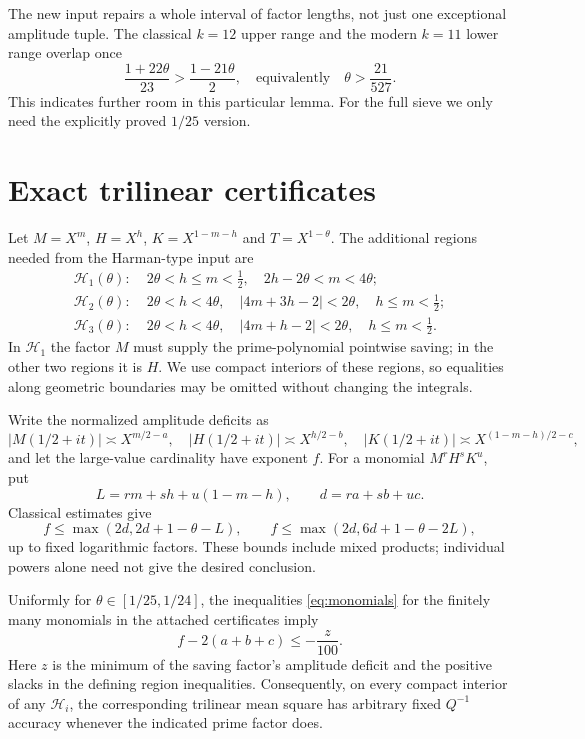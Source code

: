 \begin{remark}
The new input repairs a whole interval of factor lengths, not just
one exceptional amplitude tuple.
The classical $k=12$ upper range and the modern $k=11$ lower range
overlap once
\[
 \frac{1+22\theta}{23}>
       \frac{1-21\theta}{2},
 \quad\text{equivalently}\quad \theta>\frac{21}{527}.
\]
This indicates further room in this particular lemma.
For the full sieve we only need the explicitly proved $1/25$ version.
\end{remark}

\section{Exact trilinear certificates}

Let $M=X^m$, $H=X^h$, $K=X^{1-m-h}$ and
$T=X^{1-\theta}$. The additional regions needed from the
Harman-type input are
\begin{align*}
 \mathcal H_1(\theta):\;&
 2\theta<h\le m<\tfrac12,\quad
 2h-2\theta<m<4\theta;\\
 \mathcal H_2(\theta):\;&
 2\theta<h<4\theta,\quad
 |4m+3h-2|<2\theta,\quad h\le m<\tfrac12;\\
 \mathcal H_3(\theta):\;&
 2\theta<h<4\theta,\quad
 |4m+h-2|<2\theta,\quad h\le m<\tfrac12.
\end{align*}
In $\mathcal H_1$ the factor $M$ must supply the prime-polynomial
pointwise saving; in the other two regions it is $H$.
We use compact interiors of these regions, so equalities along
geometric boundaries may be omitted without changing the integrals.

Write the normalized amplitude deficits as
\[
 |M(1/2+it)|\asymp X^{m/2-a},\quad
 |H(1/2+it)|\asymp X^{h/2-b},\quad
 |K(1/2+it)|\asymp X^{(1-m-h)/2-c},
\]
and let the large-value cardinality have exponent $f$.
For a monomial $M^rH^sK^u$, put
\[
 L=rm+sh+u(1-m-h),\qquad d=ra+sb+uc.
\]
Classical estimates give
\begin{equation}\label{eq:monomials}
 f\le\max(2d,2d+1-\theta-L),\qquad
 f\le\max(2d,6d+1-\theta-2L),
\end{equation}
up to fixed logarithmic factors.
These bounds include mixed products; individual powers alone need
not give the desired conclusion.

\begin{lemma}\label{lem:harman}
Uniformly for $\theta\in[1/25,1/24]$, the inequalities
\eqref{eq:monomials} for the finitely many monomials in the attached
certificates imply
\begin{equation}\label{eq:certgain}
                 f-2(a+b+c)\le-\frac z{100}.
\end{equation}
Here $z$ is the minimum of the saving factor's amplitude deficit
and the positive slacks in the defining region inequalities.
Consequently, on every compact interior of any $\mathcal H_i$,
the corresponding trilinear mean square has arbitrary fixed
$Q^{-1}$ accuracy whenever the indicated prime factor does.
\end{lemma}

